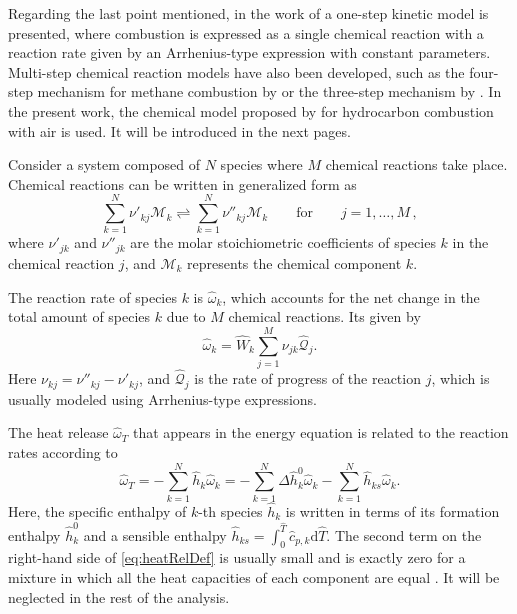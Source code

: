 Regarding the last point mentioned, in the work of \textcite{westbrookSimplifiedReactionMechanisms1981} a one-step kinetic model is presented, where combustion is expressed as a single chemical reaction with a reaction rate given by an Arrhenius-type expression with constant parameters. Multi-step chemical reaction models have also been developed, such as the four-step mechanism for methane combustion by \textcite{petersNumericalAsymptoticAnalysis1985} or the three-step mechanism by \textcite{petersAsymptoticStructureStoichiometric1987}. In the present work, the chemical model proposed by \textcite{fernandez-tarrazoSimpleOnestepChemistry2006} for hydrocarbon combustion with air is used. It will be introduced in the next pages.

Consider a system composed of $N$ species where $M$ chemical reactions take place. Chemical reactions can be written in generalized form as 
\begin{equation}\label{eq:allChemEq}
	\sum_{k=1}^{N} \nu'_{kj}\mathcal{M}_k  \rightleftharpoons \sum_{k=1}^{N} \nu''_{kj}\mathcal{M}_k  \qquad \text{for}\qquad j=1,\dots,M\, ,
\end{equation}
where $\nu'_{jk}$ and $\nu''_{jk}$ are the molar stoichiometric coefficients of species $k$ in the chemical reaction $j$, and $\mathcal{M}_k$ represents the chemical component $k$. \newline

The reaction rate of species $k$ is $\hat \omega_k$, which accounts for the net change in the total amount of species $k$ due to $M$ chemical reactions. Its given by
\begin{equation} \label{eq:reacRateDef}
	\hat \omega_k  = \hat W_k \sum_{j=1}^{M}\nu_{jk}\hat{\mathcal{Q}}_j.
\end{equation}
Here $\nu_{kj} = \nu''_{kj} -\nu'_{kj}$, and $\hat{\mathcal{Q}}_j$ is the rate of progress of the reaction $j$, which is usually modeled using Arrhenius-type expressions.\newline

The heat release $\hat \omega_T$ that appears in the energy equation is related to the reaction rates according to
\begin{equation}\label{eq:heatRelDef}
	\hat \omega _T = - \sum_{k=1}^{N} \hat h_k\hat\omega_k = - \sum_{k=1}^{N}   \Delta \hat h_k^0 \hat\omega_k   - \sum_{k=1}^{N} \hat h_{ks} \hat\omega_k.
\end{equation}
Here, the specific enthalpy of $k$-th species $\hat h_k$  is written in terms of its formation enthalpy $\hat h_k^0$ and a sensible enthalpy $\hat h_{ks} =\int_{0}^{\hat{T}} \hat c_{p,k} \text{d}\hat{T} $. The second term on the right-hand side of \cref{eq:heatRelDef} is usually small and is exactly zero for a mixture in which all the heat capacities of each component are equal  \parencite{poinsotTheoreticalNumericalCombustion2011}. It will be neglected in the rest of the analysis.
\newline

